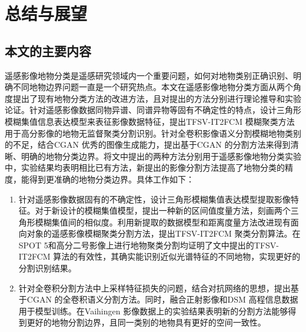 
\chapter{总结与展望}
\label{cha:chap05}

\section{本文的主要内容}
\label{sec:5-1}
遥感影像地物分类是遥感研究领域内一个重要问题，如何对地物类别正确识别、明确不同地物边界问题一直是一个研究热点。本文在遥感影像地物分类方面从两个角度提出了现有地物分类方法的改进方法，且对提出的方法分别进行理论推导和实验论证。针对遥感影像数据同物异谱、同谱异物等固有不确定性的特点，设计三角形模糊集值信息表达模型来表征影像数据特征，提出TFSV-IT2FCM 模糊聚类方法用于高分影像的地物无监督聚类分割识别。针对全卷积影像语义分割模糊地物类别的不足，结合CGAN 优秀的图像生成能力，提出基于CGAN 的分割方法来得到清晰、明确的地物分类边界。将文中提出的两种方法分别用于遥感影像地物分类实验中，实验结果均表明相比已有方法，新提出的影像分割方法提高了地物分类的精度，能得到更准确的地物分类边界。具体工作如下：
\begin{enumerate}[(1)]
  \item 针对遥感影像数据固有的不确定性，设计三角形模糊集值表达模型提取影像特征。对于新设计的模糊集值模型，提出一种新的区间值度量方法，刻画两个三角形模糊集值间的相似度。利用新提取的数据模型和距离度量方法改进现有面向对象的遥感影像模糊聚类分割方法，提出TFSV-IT2FCM 聚类分割算法。在 SPOT 5和高分二号影像上进行地物聚类分割均证明了文中提出的TFSV-IT2FCM 算法的有效性，其确实能识别近似光谱特征的不同地物，实现更好的分割识别结果。
  \item 针对全卷积分割方法中上采样特征损失的问题，结合对抗网络的思想，提出基于CGAN 的全卷积语义分割方法。同时，融合正射影像和DSM 高程信息数据用于模型训练。在Vaihingen 影像数据上的实验结果表明新的分割方法能够得到更好的地物分割边界，且同一类别的地物具有更好的空间一致性。
\end{enumerate}


